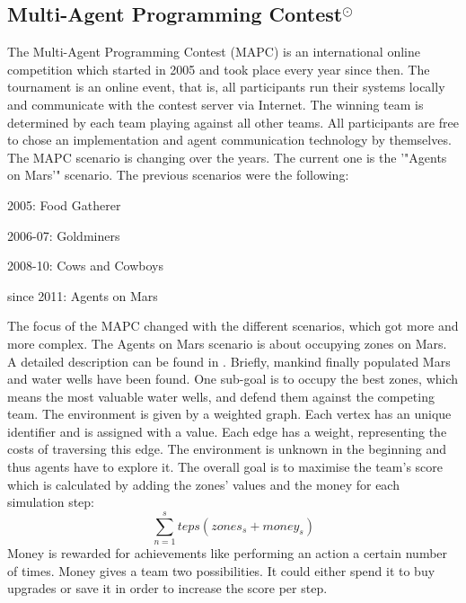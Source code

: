 \subsection[Multi-Agent Programming Contest]{Multi-Agent Programming Contest$^{\odot}$}
The Multi-Agent Programming Contest (MAPC) is an international online competition which started in 2005 and took place every year since then.
The tournament is an online event, that is, all participants run their systems locally and communicate with the contest server via Internet.
The winning team is determined by each team playing against all other teams.
All participants are free to chose an implementation and agent communication technology by themselves.
The MAPC scenario is changing over the years.
The current one is the ’"Agents on Mars’" scenario.
The previous scenarios were the following:
\begin{description}
	\item 2005: Food Gatherer
	\item 2006-07: Goldminers
	\item 2008-10: Cows and Cowboys
	\item since 2011: Agents on Mars
\end{description}
The focus of the MAPC changed with the different scenarios, which got more and more complex.
The Agents on Mars scenario is about occupying zones on Mars.
A detailed description can be found in \cite{MAPC}.
Briefly, mankind finally populated Mars and water wells have been found.
One sub-goal is to occupy the best zones, which means the most valuable water wells, and defend them against the competing team.
The environment is given by a weighted graph.
Each vertex has an unique identiﬁer and is assigned with a value.
Each edge has a weight, representing the costs of traversing this edge.
The environment is unknown in the beginning and thus agents have to explore it.
The overall goal is to maximise the team's score which is calculated by adding the zones' values and the money for each simulation step:
\begin{equation}
  \sum_{n=1}^steps (\textit{zones}_s + \textit{money}_s)
\end{equation}
Money is rewarded for achievements like performing an action a certain number of times.
Money gives a team two possibilities.
It could either spend it to buy upgrades or save it in order to increase the score per step.

